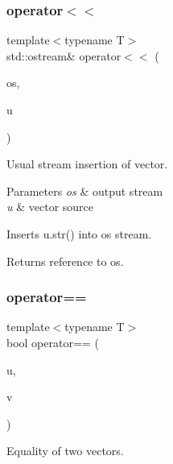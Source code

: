 \subsubsection{\texorpdfstring{operator$<$$<$}{operator<<}}
{\footnotesize\ttfamily template$<$typename T$>$ \\
std\+::ostream\& operator$<$$<$ (\begin{DoxyParamCaption}\item[{std\+::ostream \&}]{os,  }\item[{const \mbox{\hyperlink{class_n_vector}{N\+Vector}}$<$ T $>$ \&}]{u }\end{DoxyParamCaption})\hspace{0.3cm}{\ttfamily [friend]}}



Usual stream insertion of vector. 


\begin{DoxyParams}{Parameters}
{\em os} & output stream \\
\hline
{\em u} & vector source\\
\hline
\end{DoxyParams}
Inserts {\ttfamily u.\+str()} into {\ttfamily os} stream. \begin{DoxyReturn}{Returns}
reference to {\ttfamily os}. 
\end{DoxyReturn}
\mbox{\label{class_n_vector_aa1c22d1bc3a021b406c61d09f95d5e26}} 
\subsubsection{\texorpdfstring{operator==}{operator==}\hspace{0.1cm}{\footnotesize\ttfamily [1/3]}}
{\footnotesize\ttfamily template$<$typename T$>$ \\
bool operator== (\begin{DoxyParamCaption}\item[{const \mbox{\hyperlink{class_n_vector}{N\+Vector}}$<$ T $>$ \&}]{u,  }\item[{const \mbox{\hyperlink{class_n_vector}{N\+Vector}}$<$ T $>$ \&}]{v }\end{DoxyParamCaption})\hspace{0.3cm}{\ttfamily [friend]}}



Equality of two vectors. 


